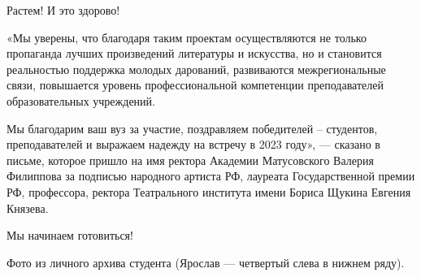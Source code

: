 Растем! И это здорово!

«Мы уверены, что благодаря таким проектам осуществляются не только пропаганда
лучших произведений литературы и искусства, но и становится реальностью
поддержка молодых дарований, развиваются межрегиональные связи, повышается
уровень профессиональной компетенции преподавателей образовательных учреждений.

Мы благодарим ваш вуз за участие, поздравляем победителей – студентов,
преподавателей и выражаем надежду на встречу в 2023 году», — сказано в письме,
которое пришло на имя ректора Академии Матусовского Валерия Филиппова за
подписью народного артиста РФ, лауреата Государственной премии РФ, профессора,
ректора Театрального института имени Бориса Щукина Евгения Князева.

Мы начинаем готовиться!

 

Фото из личного архива студента (Ярослав — четвертый слева в нижнем ряду).
